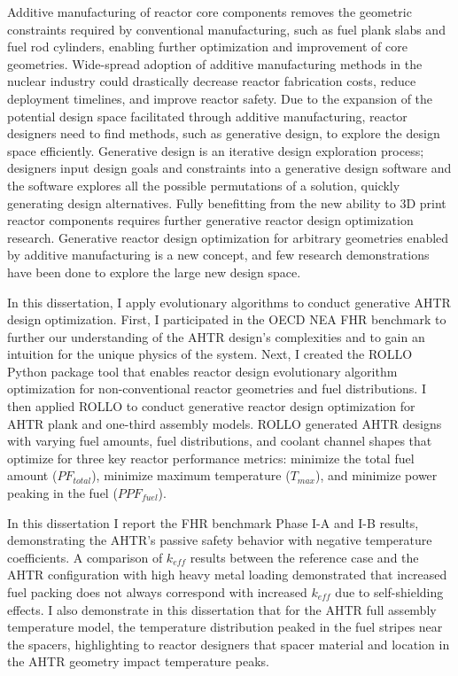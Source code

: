 

Additive manufacturing of reactor core components removes the geometric constraints
required by conventional manufacturing, such as fuel plank slabs and fuel rod 
cylinders, enabling further optimization and improvement of core geometries. 
Wide-spread adoption of additive manufacturing methods in the nuclear industry 
could drastically decrease reactor fabrication costs, reduce deployment timelines, 
and improve reactor safety. 
Due to the expansion of the potential design space facilitated through additive 
manufacturing, reactor designers need to find methods, such as generative 
design, to explore the design space efficiently.
Generative design is an iterative design exploration process; designers input design 
goals and constraints into a generative design software and the software explores 
all the possible permutations of a solution, quickly generating design alternatives. 
Fully benefitting from the new ability to 3D print reactor components requires further 
generative reactor design optimization research.  
Generative reactor design optimization for arbitrary geometries enabled by additive 
manufacturing is a new concept, and few research demonstrations have been done to 
explore the large new design space. 

In this dissertation, I apply evolutionary algorithms to conduct generative \gls{AHTR} 
design optimization. 
First, I participated in the \gls{OECD} \gls{NEA} \gls{FHR} benchmark to further our 
understanding of the \gls{AHTR} design's complexities and to gain an intuition 
for the unique physics of the system.  
Next, I created the \gls{ROLLO} Python package tool that enables reactor design 
evolutionary algorithm optimization for non-conventional reactor geometries and fuel 
distributions. 
I then applied \gls{ROLLO} to conduct generative reactor design optimization
for \gls{AHTR} plank and one-third assembly models.
\gls{ROLLO} generated \gls{AHTR} designs with varying fuel amounts, fuel 
distributions, and coolant channel shapes that optimize for three key reactor 
performance metrics: minimize the total fuel amount ($PF_{total}$), minimize maximum 
temperature ($T_{max}$), and minimize power peaking in the fuel ($PPF_{fuel}$).

In this dissertation I report the \gls{FHR} benchmark Phase I-A and I-B results, 
demonstrating the \gls{AHTR}'s passive safety behavior with negative temperature 
coefficients.
A comparison of $k_{eff}$ results between the reference case and the \gls{AHTR} 
configuration with high heavy metal loading demonstrated that increased fuel 
packing does not always correspond with increased $k_{eff}$ due to self-shielding 
effects.
I also demonstrate in this dissertation that for the \gls{AHTR} full assembly 
temperature model, the temperature distribution peaked in the fuel stripes near 
the spacers, highlighting to reactor designers that spacer material and location 
in the \gls{AHTR} geometry impact temperature peaks.  

